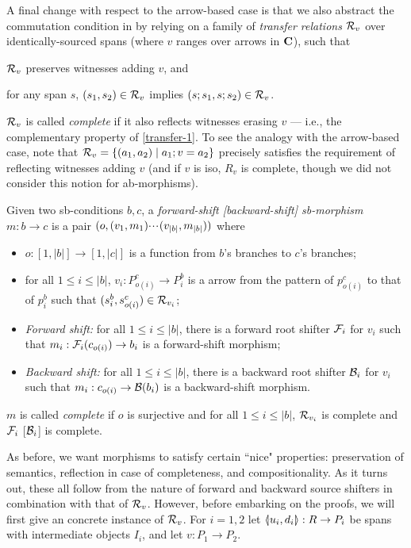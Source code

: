 A final change with respect to the arrow-based case is that we also abstract the commutation condition in  by relying on a family of \emph{transfer relations} $\mathcal{R}_v$ over identically-sourced spans (where $v$ ranges over arrows in $\mathbf{C}$), such that
%
\begin{enumerate*}[label=\emph{(\roman*)}]
\item\label{transfer-1} $\mathcal{R}_v$ preserves witnesses adding $v$, and
\item\label{transfer-2} for any span $s$, $(s_1,s_2)\in \mathcal{R}_v$ implies $(s;s_1,s;s_2)\in \mathcal{R}_v$.
\end{enumerate*}
%
$\mathcal{R}_v$ is called \emph{complete} if it also reflects witnesses erasing $v$ --- i.e., the complementary property of \ref{transfer-1}. To see the analogy with the arrow-based case, note that $\mathcal{R}_v=\{{(a_1,a_2)\mid a_1;v=a_2}\}$ precisely satisfies the requirement of reflecting witnesses adding $v$ (and if $v$ is iso, $R_v$ is complete, though we did not consider this notion for ab-morphisms).
%
\begin{definition}
  Given two sb-conditions $b,c$, a \emph{forward-shift [backward-shift] sb-morphism} $m:b\to c$ is a pair $(o,(v_1,m_1){\cdotp\mkern-2mu\cdotp\mkern-2mu\cdotp\mkern1mu} (v_{|b|},m_{|b|}))$ where
  \begin{itemize}
  \item $o:[1,|b|]\to [1,|c|]$ is a function from $b$'s branches to $c$'s branches;
  \item for all $1\leq i\leq |b|$, $v_i:P^c_{o(i)}\to P^b_i$ is a arrow from the pattern of $p^c_{o(i)}$ to that of $p^b_i$ such that $(s^b_i,s^c_{o(i)})\in \mathcal{R}_{v_i}$;
  \item \emph{Forward shift:} for all $1\leq i\leq |b|$, there is a forward root shifter $\mathcal{F}_i$ for $v_i$ such that $m_i:\mathcal{F}_i(c_{o(i)})\to b_i$ is a forward-shift morphism;
  \item \emph{Backward shift:} for all $1\leq i\leq |b|$, there is a backward root shifter $\mathcal{B}_i$ for $v_i$ such that $m_i:c_{o(i)}\to \mathcal{B}(b_i)$ is a backward-shift morphism.
  \end{itemize}
  $m$ is called \emph{complete} if $o$ is surjective and for all $1\leq i\leq |b|$, $\mathcal{R}_{v_i}$ is complete and $\mathcal{F}_i$ [$\mathcal{B}_i$] is complete.
\end{definition}
%
As before, we want morphisms to satisfy certain ``nice" properties: preservation of semantics, reflection in case of completeness, and compositionality. As it turns out, these all follow from the nature of forward and backward source shifters in combination with that of $\mathcal{R}_v$. However, before embarking on the proofs, we will first give an concrete instance of $\mathcal{R}_v$. For $i=1,2$ let $\spanof{u_i}{d_i}:R\to P_i$ be spans with intermediate objects $I_i$, and let $v:P_1\to P_2$.

